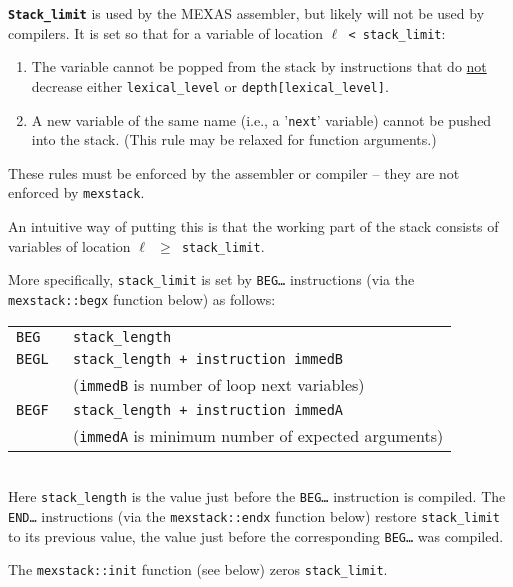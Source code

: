 \documentclass[12pt]{article}
\newcommand{\TT}[1]{{\tt \bfseries #1}}
\newcommand{\EOL}{\penalty \exhyphenpenalty}
\newenvironment{indpar}[1][0.3in]%
	{\begin{list}{}%
		     {\setlength{\itemsep}{0in}%
		      \setlength{\topsep}{0in}%
		      \setlength{\parsep}{1ex}%
		      \setlength{\labelwidth}{#1}%
		      \setlength{\leftmargin}{#1}%
		      \addtolength{\leftmargin}{\labelsep}}%
	 \item}%
	{\end{list}}
\begin{document}
\begin{indpar}
\TT{Stack\_limit} is used by the MEXAS assembler, but likely will not be
used by compilers.
It is set so that for a variable of location
{\tt $\ell$ < stack\_limit}\label{STACK-LIMIT}:
\begin{enumerate}
\item The variable cannot be popped from the stack by instructions
that do \underline{not} decrease either {\tt lexical\_level} or
{\tt depth[lexical\_level]}.
\item A new variable of the same name (i.e., a '{\tt next}' variable)
cannot be pushed into the stack.  (This rule may be relaxed for
function arguments.)
\end{enumerate}

These rules must be enforced by the assembler or
compiler -- they are not enforced
by {\tt mexstack}.

An intuitive way of putting this is that the working part of the
stack consists of variables of location {\tt $\ell$ $\geq$ stack\_limit}.

More specifically, {\tt stack\_limit} is set by {\tt BEG\ldots}
instructions (via the {\tt mexstack::\EOL begx} function below) as follows: \\
\hspace*{3em}\begin{tabular}{@{}ll}
\tt BEG & \tt stack\_length \\
\tt BEGL & \tt stack\_length + {\rm instruction} immedB \\
         & ({\tt immedB} is number of loop next variables) \\
\tt BEGF & \tt stack\_length + {\rm instruction} immedA \\
         & ({\tt immedA} is minimum number of expected arguments) \\
\end{tabular} \\
Here {\tt stack\_length} is the value just before the {\tt BEG\ldots}
instruction is compiled.
The {\tt END\ldots} instructions (via the {\tt mexstack::endx} function below)
restore {\tt stack\_\EOL limit} to its previous value, the value
just before the corresponding {\tt BEG\ldots} was compiled.

The {\tt mexstack::init} function (see below) zeros {\tt stack\_limit}.
\end{indpar}
\end{document}
